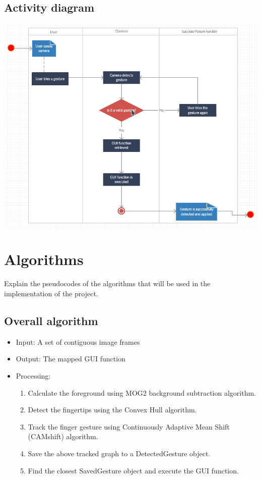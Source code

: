 \documentclass{scrreprt}
\begin{document}
\section{Activity diagram}
\begin{center}
    \includegraphics[scale=0.8]{activitydiagram.png}
\end{center}

\chapter{Algorithms}
Explain the pseudocodes of the algorithms that will be used in the implementation of the project.
\section{Overall algorithm}
\begin{itemize}
    \item Input: A set of contiguous image frames
    \item Output: The mapped GUI function
    \item Processing:
    \begin{enumerate}
        \item Calculate the foreground using MOG2 background subtraction algorithm.
        \item Detect the fingertips using the Convex Hull algorithm.
        \item Track the finger gesture using Continuously Adaptive Mean Shift (CAMshift) algorithm.
        \item Save the above tracked graph to a DetectedGesture object.
        \item Find the closest SavedGesture object and execute the GUI function.
    \end{enumerate}
\end{itemize}
\end{document}
